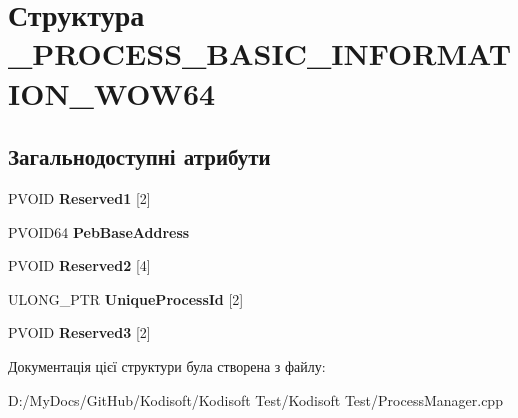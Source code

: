 \hypertarget{struct___p_r_o_c_e_s_s___b_a_s_i_c___i_n_f_o_r_m_a_t_i_o_n___w_o_w64}{\section{Структура \+\_\+\+P\+R\+O\+C\+E\+S\+S\+\_\+\+B\+A\+S\+I\+C\+\_\+\+I\+N\+F\+O\+R\+M\+A\+T\+I\+O\+N\+\_\+\+W\+O\+W64}
\label{struct___p_r_o_c_e_s_s___b_a_s_i_c___i_n_f_o_r_m_a_t_i_o_n___w_o_w64}
}
\subsection*{Загальнодоступні атрибути}
\begin{DoxyCompactItemize}
\item 
\hypertarget{struct___p_r_o_c_e_s_s___b_a_s_i_c___i_n_f_o_r_m_a_t_i_o_n___w_o_w64_a76d2b713a1fc15eb28740b8d92c329a7}{P\+V\+O\+I\+D {\bfseries Reserved1} \mbox{[}2\mbox{]}}\label{struct___p_r_o_c_e_s_s___b_a_s_i_c___i_n_f_o_r_m_a_t_i_o_n___w_o_w64_a76d2b713a1fc15eb28740b8d92c329a7}

\item 
\hypertarget{struct___p_r_o_c_e_s_s___b_a_s_i_c___i_n_f_o_r_m_a_t_i_o_n___w_o_w64_ae608541a30cf81b28d987454f2a41d2d}{P\+V\+O\+I\+D64 {\bfseries Peb\+Base\+Address}}\label{struct___p_r_o_c_e_s_s___b_a_s_i_c___i_n_f_o_r_m_a_t_i_o_n___w_o_w64_ae608541a30cf81b28d987454f2a41d2d}

\item 
\hypertarget{struct___p_r_o_c_e_s_s___b_a_s_i_c___i_n_f_o_r_m_a_t_i_o_n___w_o_w64_a97857e0cf153a2b02267bf909aab37b3}{P\+V\+O\+I\+D {\bfseries Reserved2} \mbox{[}4\mbox{]}}\label{struct___p_r_o_c_e_s_s___b_a_s_i_c___i_n_f_o_r_m_a_t_i_o_n___w_o_w64_a97857e0cf153a2b02267bf909aab37b3}

\item 
\hypertarget{struct___p_r_o_c_e_s_s___b_a_s_i_c___i_n_f_o_r_m_a_t_i_o_n___w_o_w64_af871edc4d0bb2dee56c2464028739fda}{U\+L\+O\+N\+G\+\_\+\+P\+T\+R {\bfseries Unique\+Process\+Id} \mbox{[}2\mbox{]}}\label{struct___p_r_o_c_e_s_s___b_a_s_i_c___i_n_f_o_r_m_a_t_i_o_n___w_o_w64_af871edc4d0bb2dee56c2464028739fda}

\item 
\hypertarget{struct___p_r_o_c_e_s_s___b_a_s_i_c___i_n_f_o_r_m_a_t_i_o_n___w_o_w64_aa726c8cc84e924b0b0fddf1f34708526}{P\+V\+O\+I\+D {\bfseries Reserved3} \mbox{[}2\mbox{]}}\label{struct___p_r_o_c_e_s_s___b_a_s_i_c___i_n_f_o_r_m_a_t_i_o_n___w_o_w64_aa726c8cc84e924b0b0fddf1f34708526}

\end{DoxyCompactItemize}


Документація цієї структури була створена з файлу\+:\begin{DoxyCompactItemize}
\item 
D\+:/\+My\+Docs/\+Git\+Hub/\+Kodisoft/\+Kodisoft Test/\+Kodisoft Test/Process\+Manager.\+cpp\end{DoxyCompactItemize}

